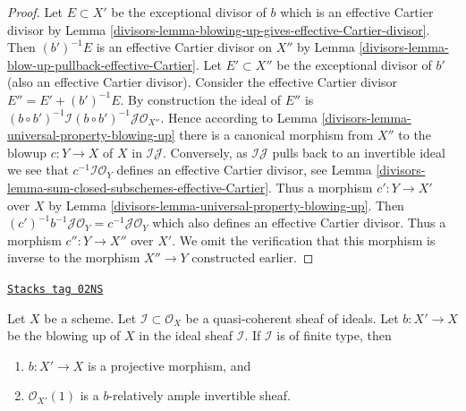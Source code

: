 \begin{proof}

Let $E \subset X'$ be the exceptional divisor of $b$ which is an effective
Cartier divisor by
Lemma \ref{divisors-lemma-blowing-up-gives-effective-Cartier-divisor}.
Then $(b')^{-1}E$ is an effective Cartier divisor on $X''$ by
Lemma \ref{divisors-lemma-blow-up-pullback-effective-Cartier}.
Let $E' \subset X''$ be the exceptional divisor of $b'$ (also an effective
Cartier divisor). Consider the effective Cartier divisor
$E'' = E' + (b')^{-1}E$. By construction the ideal of $E''$ is
$(b \circ b')^{-1}\mathcal{I} (b \circ b')^{-1}\mathcal{J} \mathcal{O}_{X''}$.
Hence according to Lemma \ref{divisors-lemma-universal-property-blowing-up}
there is a canonical morphism from $X''$ to the blowup $c : Y \to X$
of $X$ in $\mathcal{I}\mathcal{J}$. Conversely, as $\mathcal{I}\mathcal{J}$
pulls back to an invertible ideal we see that
$c^{-1}\mathcal{I}\mathcal{O}_Y$ defines
an effective Cartier divisor, see
Lemma \ref{divisors-lemma-sum-closed-subschemes-effective-Cartier}.
Thus a morphism $c' : Y \to X'$ over $X$ by
Lemma \ref{divisors-lemma-universal-property-blowing-up}.
Then $(c')^{-1}b^{-1}\mathcal{J}\mathcal{O}_Y = c^{-1}\mathcal{J}\mathcal{O}_Y$
which also defines an effective Cartier divisor. Thus a morphism
$c'' : Y \to X''$ over $X'$. We omit the verification that this
morphism is inverse to the morphism $X'' \to Y$ constructed earlier.
\end{proof}

\begin{lemma}
\label{divisors-lemma-blowing-up-projective}
\href{https://stacks.math.columbia.edu/tag/02NS}{\texttt{Stacks tag 02NS}}

Let $X$ be a scheme. Let $\mathcal{I} \subset \mathcal{O}_X$ be a
quasi-coherent sheaf of ideals. Let $b : X' \to X$ be the blowing up of $X$
in the ideal sheaf $\mathcal{I}$. If $\mathcal{I}$ is of finite type, then
\begin{enumerate}
\item $b : X' \to X$ is a projective morphism, and
\item $\mathcal{O}_{X'}(1)$ is a $b$-relatively ample invertible sheaf.
\end{enumerate}
\end{lemma}

